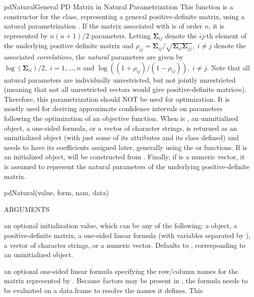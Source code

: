 \documentclass[pdftex]{article} \usepackage{url,graphicx}
\newcommand{\bm}[1]{{\boldsymbol {#1}}}
\newcommand{\bS}{\bm\Sigma}
\begin{document}
\begin{Helpfile}{pdNatural}{General PD Matrix in Natural Parametrization}
  This function is a constructor for the  class,
  representing a general positive-definite matrix, using a natural
  parametrization . If the matrix associated with  is of
  order $n$, it is represented by $n(n+1)/2$ parameters. Letting
  $\bS_{ij}$ denote the $ij$-th element of the underlying positive
  definite matrix and $\rho_{ij} = \bS_{ij}/\sqrt{\bS_{ii}\bS_{jj}},\;
  i \neq j$ denote the associated \emph{correlations}, the
  \emph{natural} parameters are given by
    $\log(\bS_{ii})/2,\;i=1,\ldots,n$ and
    $\log((1+\rho_{ij})/(1-\rho_{ij})),\; i \neq j$. Note that all
    natural parameters are individually unrestricted, but not jointly
    unrestricted (meaning that not all unrestricted vectors would give
    positive-definite matrices). Therefore, this parametrization
    should NOT be used for optimization. It is mostly used for
    deriving approximate confidence intervals on parameters following
    the optimization of an objective function. When  is
    , an uninitialized  object, a one-sided
    formula, or a vector of character strings,  is returned
    as an uninitialized  object (with just some of its
    attributes and its class defined) and needs to have its
    coefficients assigned later, generally using the  or
     functions. If  is an initialized 
    object,  will be constructed from
    . Finally, if  is a numeric vector,
    it is assumed to represent the natural parameters of the
    underlying positive-definite matrix.
\begin{Example}
pdNatural(value, form, nam, data)
\end{Example}
\begin{Argument}{ARGUMENTS}
\item[\Co{value:}]
an optional initialization value, which can be any of the
following: a  object, a positive-definite
matrix, a one-sided linear formula (with variables separated by
\Co{+}), a vector of character strings, or a numeric
vector. Defaults to , corresponding to an
uninitialized object.
\item[\Co{form:}]
an optional one-sided linear formula specifying the
row/column names for the matrix represented by . Because
factors may be present in , the formula needs to be
evaluated on a data.frame to resolve the names it defines. This

\end{Argument}
\end{Helpfile}
\end{document}

